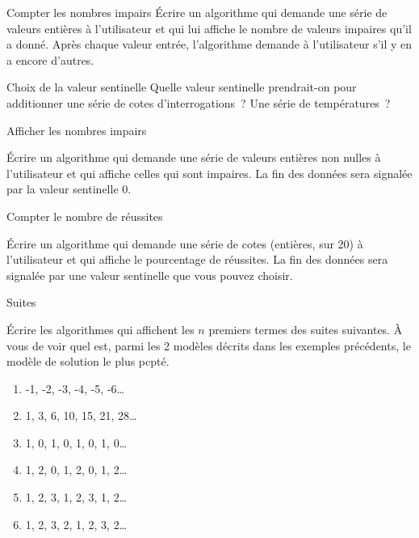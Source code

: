 		\begin{Exercice}{Compter les nombres impairs}
			Écrire un algorithme qui demande une série
			de valeurs entières à l’utilisateur
			et qui lui affiche le nombre de valeurs impaires
			qu’il a donné.
			Après chaque valeur entrée,
			l’algorithme demande à l’utilisateur s’il y en a encore d’autres.
		\end{Exercice}

		\begin{Exercice}{Choix de la valeur sentinelle}
			Quelle valeur sentinelle prendrait-on 
			pour additionner une série de cotes d’interrogations~? 
			Une série de températures~?
		\end{Exercice}

		\begin{Exercice}{Afficher les nombres impairs}

			Écrire un algorithme qui demande une série
			de valeurs entières non nulles à l’utilisateur
			et qui affiche celles qui sont impaires.
			La fin des données sera signalée 
			par la valeur sentinelle 0.
		\end{Exercice}

		\begin{Exercice}{Compter le nombre de réussites}

			Écrire un algorithme qui demande une série
			de cotes (entières, sur 20) à l’utilisateur
			et qui affiche le pourcentage de réussites.
			La fin des données sera signalée 
			par une valeur sentinelle que vous pouvez choisir.
		\end{Exercice}

		\begin{Exercice}{Suites}

			Écrire les algorithmes qui affichent
			les $n$ premiers termes des suites suivantes.
			À vous de voir quel est, parmi les 2 modèles 
			décrits dans les exemples précédents, le 
			modèle de solution
			le plus pcpté.
			\begin{enumerate}[label=\alph*)]
				\item -1, -2, -3, -4, -5, -6\dots
				\item 1, 3, 6, 10, 15, 21, 28\dots
				\item 1, 0, 1, 0, 1, 0, 1, 0\dots
				\item 1, 2, 0, 1, 2, 0, 1, 2\dots
				\item 1, 2, 3, 1, 2, 3, 1, 2\dots
				\item 1, 2, 3, 2, 1, 2, 3, 2\dots
			\end{enumerate}			
		\end{Exercice}

